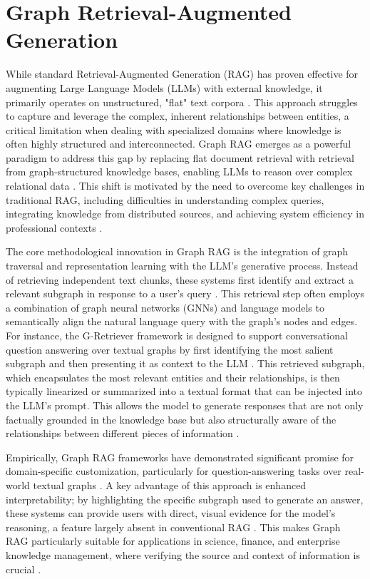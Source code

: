 \documentclass[11pt]{article}
\begin{document}
\section{Graph Retrieval-Augmented Generation}
While standard Retrieval-Augmented Generation (RAG) has proven effective for augmenting Large Language Models (LLMs) with external knowledge, it primarily operates on unstructured, "flat" text corpora \cite{ref18}. This approach struggles to capture and leverage the complex, inherent relationships between entities, a critical limitation when dealing with specialized domains where knowledge is often highly structured and interconnected. Graph RAG emerges as a powerful paradigm to address this gap by replacing flat document retrieval with retrieval from graph-structured knowledge bases, enabling LLMs to reason over complex relational data . This shift is motivated by the need to overcome key challenges in traditional RAG, including difficulties in understanding complex queries, integrating knowledge from distributed sources, and achieving system efficiency in professional contexts \cite{ref18}.

The core methodological innovation in Graph RAG is the integration of graph traversal and representation learning with the LLM's generative process. Instead of retrieving independent text chunks, these systems first identify and extract a relevant subgraph in response to a user's query \cite{ref7}. This retrieval step often employs a combination of graph neural networks (GNNs) and language models to semantically align the natural language query with the graph's nodes and edges. For instance, the G-Retriever framework is designed to support conversational question answering over textual graphs by first identifying the most salient subgraph and then presenting it as context to the LLM \cite{ref7}. This retrieved subgraph, which encapsulates the most relevant entities and their relationships, is then typically linearized or summarized into a textual format that can be injected into the LLM's prompt. This allows the model to generate responses that are not only factually grounded in the knowledge base but also structurally aware of the relationships between different pieces of information \cite{ref18}.

Empirically, Graph RAG frameworks have demonstrated significant promise for domain-specific customization, particularly for question-answering tasks over real-world textual graphs \cite{ref7}. A key advantage of this approach is enhanced interpretability; by highlighting the specific subgraph used to generate an answer, these systems can provide users with direct, visual evidence for the model's reasoning, a feature largely absent in conventional RAG \cite{ref7}. This makes Graph RAG particularly suitable for applications in science, finance, and enterprise knowledge management, where verifying the source and context of information is crucial \cite{ref18}.
\end{document}

